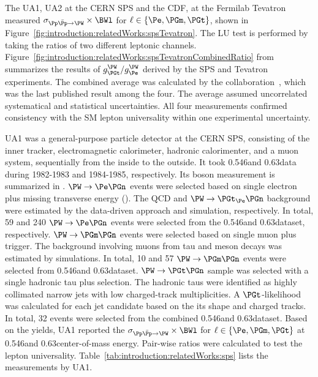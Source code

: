 The UA1, UA2 at the CERN SPS and the CDF, \DZERO at the Fermilab Tevatron measured $\sigma_{\Pp\bar{\Pp}\to \PW} \times \BWl$ for $\ell \in \{ \Pe, \PGm, \PGt\}$, shown in Figure~\ref{fig:introduction:relatedWorks:spsTevatron}. The LU test is performed by taking the ratios of two different leptonic channels. Figure~\ref{fig:introduction:relatedWorks:spsTevatronCombinedRatio} from \cite{Abbott:1999pk} summarizes the results of $g^\PW_\PGt / g^\PW_\Pe$ derived by the SPS and Tevatron experiments. The combined average was calculated by the \DZERO collaboration~\cite{Abbott:1999pk}, which was the last published result among the four. The average assumed uncorrelated systematical and statistical uncertainties. All four measurements confirmed consistency with the SM lepton universality within one experimental uncertainty.





UA1 was a general-purpose particle detector at the CERN SPS, consisting of the inner tracker, electromagnetic calorimeter, hadronic calorimenter, and a muon system, sequentially from the inside to the outside.  It took 0.546\TeV and 0.63\TeV data during 1982-1983 and 1984-1985, respectively.  Its \PW boson measurement is summarized in \cite{Albajar:1988ka}.  $\PW \to \Pe \PGn$ events were selected based on single electron plus missing transverse energy (\MET). The QCD and $\PW\to \PGt_\Pe \PGn$ background were estimated by the data-driven approach and simulation, respectively. In total, 59 and 240 $\PW \to \Pe \PGn$ events were selected from the 0.546\TeV and 0.63\TeV dataset, respectively.  $\PW \to \PGm \PGn$ events were selected based on single muon plus \MET trigger. The background involving muons from tau and meson decays was estimated by simulations. In total, 10 and 57 $\PW\to \PGm\PGn$ events were selected from 0.546\TeV and 0.63\TeV dataset.  $\PW\to \PGt \PGn$ sample was selected with a single hadronic tau plus \MET selection. The hadronic taus were identified as highly collimated narrow jets with low charged-track multiplicities.  A $\PGt$-likelihood was calculated for each jet candidate based on the its shape and charged tracks. In total, 32 events were selected from the combined 0.546\TeV and 0.63\TeV dataset. Based on the yields, UA1 reported the $\sigma_{\Pp\bar{\Pp}\to \PW} \times \BWl$ for $\ell \in \{ \Pe, \PGm, \PGt\}$ at 0.546\TeV and 0.63\TeV center-of-mass energy. Pair-wise ratios were calculated to test the lepton universality. Table~\ref{tab:introduction:relatedWorks:sps} lists the measurements by UA1.



